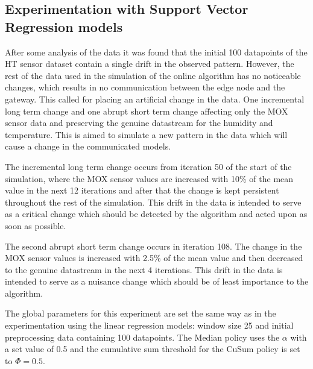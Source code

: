 \documentclass{mpaper}
\begin{document}
\subsection{Experimentation with Support Vector Regression models}

After some analysis of the data it was found that the initial 100 datapoints of the HT sensor dataset contain a single drift in the observed pattern. However, the rest of the data used in the simulation of the online algorithm has no noticeable changes, which results in no communication between the edge node and the gateway. This called for placing an artificial change in the data. One incremental long term change and one abrupt short term change affecting only the MOX sensor data and preserving the genuine datastream for the humidity and temperature. This is aimed to simulate a new pattern in the data which will cause a change in the communicated models.

The incremental long term change occurs from iteration 50 of the start of the simulation, where the MOX sensor values are increased with 10\% of the mean value in the next 12 iterations and after that the change is kept persistent throughout the rest of the simulation. This drift in the data is intended to serve as a critical change \cite{lautay2018} which should be detected by the algorithm and acted upon as soon as possible.

The second abrupt short term change occurs in iteration 108. The change in the MOX sensor values is increased with 2.5\% of the mean value and then decreased to the genuine datastream in the next 4 iterations. This drift in the data is intended to serve as a nuisance change \cite{lautay2018} which should be of least importance to the algorithm.

The global parameters for this experiment are set the same way as in the experimentation using the linear regression models: window size 25 and initial preprocessing data containing 100 datapoints. 
The Median policy uses the $\alpha$ with a set value of 0.5 and the cumulative sum threshold for the CuSum policy is set to $\Phi=0.5$.
\end{document}
